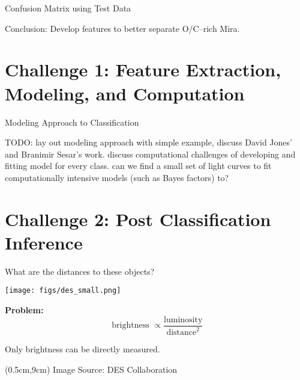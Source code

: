 \documentclass[12pt]{beamer}
\newcommand{\todo}[1]{{\color{red}TODO: #1}}
\newcommand{\foot}[1]{\begin{textblock*}{12cm}(0.5cm,9cm) %
  {\tiny #1}
      \end{textblock*}}
\begin{document}
\begin{frame}{Confusion Matrix using Test Data}

\begin{center}

\end{center}

\vspace{.1in}

Conclusion: Develop features to better separate O/C--rich Mira.

\end{frame}

\section{Challenge 1: Feature Extraction, Modeling, and Computation}

\begin{frame}{Modeling Approach to Classification}

  \todo{lay out modeling approach with simple example, discuss David Jones' and Branimir Sesar's work. discuss computational challenges of developing and fitting model for every class. can we find a small set of light curves to fit computationally intensive models (such as Bayes factors) to?}
  
\end{frame}

\section{Challenge 2: Post Classification Inference}

\begin{frame}{What are the distances to these objects?}

  \begin{center}
    \texttt{[image: figs/des\_small.png]}\\
  \end{center}
  \textbf{Problem:}
  \begin{equation*}
    \text{ brightness } \propto \frac{\text{luminosity}}{\text{distance}^2}
  \end{equation*}
\begin{center}
  Only brightness can be directly measured.
  \end{center}

\foot{Image Source: DES Collaboration}
\end{frame}
\end{document}
